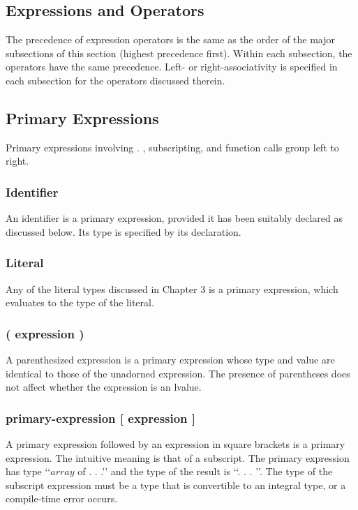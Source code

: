 \begin{homeworkProblem}
	\chapter{Expressions and Operators}
    The precedence of expression operators is the same as the order of the major subsections of this section (highest precedence first). Within each subsection, the operators have the same precedence. Left- or right-associativity is specified in each subsection for the operators discussed therein.
	\section{Primary Expressions}
	Primary expressions involving . , subscripting, and function calls group left to right.
	
	\subsection{Identifier}
    An identifier is a primary expression, provided it has been suitably declared as discussed below. Its type is specified by its declaration.
    
	\subsection{Literal}
    Any of the literal types discussed in Chapter 3 is a primary expression, which evaluates to the type of the literal.

    \subsection{( expression )}
    A parenthesized expression is a primary expression whose type and value are identical to those of the unadorned expression. The presence of parentheses does not affect whether the expression is an lvalue.

    \subsection{primary-expression [ expression ]}
    A primary expression followed by an expression in square brackets is a primary expression. The intuitive meaning is that of a subscript. The primary expression has type ‘‘$array$ of . . .’’ and the type of the result is ‘‘. . . ’’. The type of the subscript expression must be a type that is convertible to an integral type, or a compile-time error occurs.


\end{homeworkProblem}
